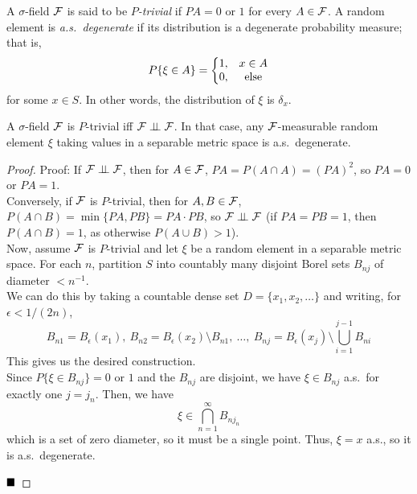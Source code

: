 
\begin{definition}
    A $\sigma$-field $\cal{F}$ is said to be \emph{$P$-trivial} if $PA = 0$ or $1$ for every $A \in \cal{F}$. A random element is \emph{a.s.\ degenerate} if its distribution is a degenerate probability measure; that is,
    \[ P\{\xi \in A\} = \left\{\begin{matrix} 1, & x \in A \\ 0, & \tt{else} \end{matrix}\right. \]
    for some $x \in S$. In other words, the distribution of $\xi$ is $\delta_x$.
\end{definition}

\begin{lemma}
    A $\sigma$-field $\cal{F}$ is $P$-trivial iff $\cal{F} \perp\!\!\!\perp \cal{F}$. In that case, any $\cal{F}$-measurable random element $\xi$ taking values in a separable metric space is a.s.\ degenerate.
\end{lemma}
\begin{proof}{Proof:}
    If $\cal{F} \perp\!\!\!\perp \cal{F}$, then for $A \in \cal{F}$, $PA = P(A \cap A) = (PA)^2$, so $PA = 0$ or $PA = 1$.\\

    Conversely, if $\cal{F}$ is $P$-trivial, then for $A, B \in \cal{F}$, $P(A \cap B) = \min\{PA, PB\} = PA \cdot PB$, so $\cal{F} \perp\!\!\!\perp \cal{F}$ (if $PA = PB = 1$, then $P(A \cap B) = 1$, as otherwise $P(A \cup B) > 1$).\\

    Now, assume $\cal{F}$ is $P$-trivial and let $\xi$ be a random element in a separable metric space. For each $n$, partition $S$ into countably many disjoint Borel sets $B_{nj}$ of diameter $< n^{-1}$.\\

    We can do this by taking a countable dense set $D = \{x_1, x_2, \ldots\}$ and writing, for $\epsilon < 1/(2n)$,
    \[ B_{n1} = B_{\epsilon}(x_1),\ B_{n2} = B_{\epsilon}(x_2) \setminus B_{n1},\ \ldots,\ B_{nj} = B_{\epsilon}(x_j) \setminus \bigcup_{i = 1}^{j - 1} B_{ni} \]
    This gives us the desired construction.\\

    Since $P\{\xi \in B_{nj}\} = 0$ or $1$ and the $B_{nj}$ are disjoint, we have $\xi \in B_{nj}$ a.s.\ for exactly one $j = j_n$. Then, we have
    \[ \xi \in \bigcap_{n = 1}^{\infty} B_{nj_n} \]
    which is a set of zero diameter, so it must be a single point. Thus, $\xi = x$ a.s., so it is a.s.\ degenerate.

    $\qed$
\end{proof}


